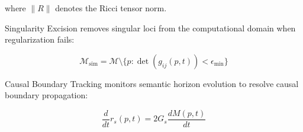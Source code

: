 where \(\|R\|\) denotes the Ricci tensor norm.

Singularity Excision removes singular loci from the computational domain when regularization fails:

\begin{equation}
\mathcal{M}_{\text{sim}} = \mathcal{M} \setminus \{p : \det(g_{ij}(p, t)) < \epsilon_{\text{min}}\}
\end{equation}

Causal Boundary Tracking monitors semantic horizon evolution to resolve causal boundary propagation:

\begin{equation}
\frac{d}{dt} r_s(p, t) = 2G_s \frac{dM(p, t)}{dt}
\end{equation}